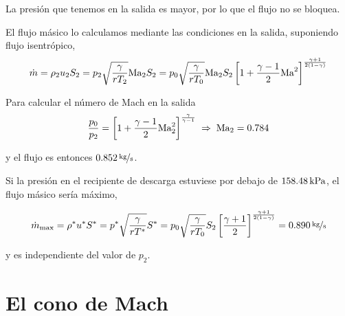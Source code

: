 		La presión que tenemos en la salida es mayor, por lo que el flujo
		no se bloquea.

		El flujo másico lo calculamos mediante las condiciones en la salida,
		suponiendo flujo isentrópico,{\footnotesize{}
			\[
			\dot{m}=\rho_{2}u_{2}S_{2}=p_{2}\sqrt{\frac{\gamma}{rT_{2}}}\text{Ma}_{2}S_{2}=p_{0}\sqrt{\frac{\gamma}{rT_{0}}}\text{Ma}_{2}S_{2}\left[1+\frac{\gamma-1}{2}\text{Ma}^{2}\right]^{\frac{\gamma+1}{2\left(1-\gamma\right)}}
			\]
		}{\footnotesize\par}
		
		Para calcular el número de Mach en la salida
		\[
		\frac{p_{0}}{p_{2}}=\left[1+\frac{\gamma-1}{2}\text{Ma}_{2}^{2}\right]^{\frac{\gamma}{\gamma-1}}\;\Rightarrow\;\text{Ma}_{2}=0.784
		\]
		
		y el flujo es entonces $\unitfrac[0.852]{kg}{s}$.
		
		Si la presión en el recipiente de descarga estuviese por debajo de
		$\unit[158.48]{kPa}$, el flujo másico sería máximo,
		
		{\footnotesize{}
			\[
			\dot{m}_{\textrm{max}}=\rho^{*}u^{*}S^{*}=p^{*}\sqrt{\frac{\gamma}{rT^{*}}}S^{*}=p_{0}\sqrt{\frac{\gamma}{rT_{0}}}S_{2}\left[\frac{\gamma+1}{2}\right]^{\frac{\gamma+1}{2\left(1-\gamma\right)}}=\unitfrac[0.890]{kg}{s}
			\]
		}{\footnotesize\par}
		
		y es independiente del valor de $p_{2}$.


\section{El cono de Mach}

	
	\begin{center}
		\begin{animateinline}[poster=last,controls]{8}
			
		\end{animateinline}
		\par\end{center}
	

